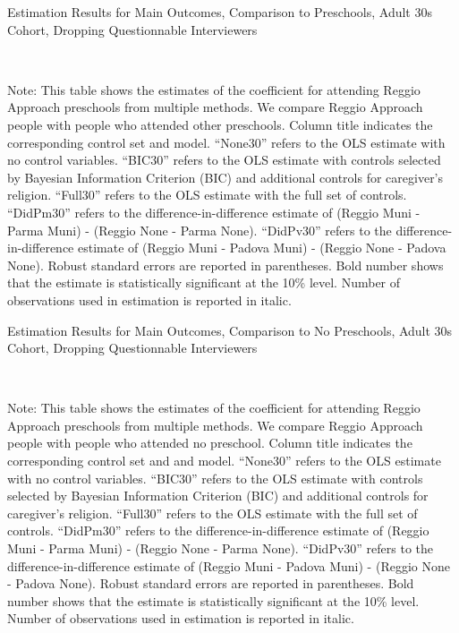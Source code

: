 \begin{table}[H] \caption{Estimation Results for Main Outcomes, Comparison to Preschools, Adult 30s Cohort, Dropping Questionnable Interviewers} \label{ols-M-adult30-reg-pres-dropint}
\scalebox{0.75}{}
\vspace{1ex} \\
\footnotesize\raggedright{Note: This table shows the estimates of the coefficient for attending Reggio Approach preschools from multiple methods. We compare Reggio Approach people with people who attended other preschools.  Column title indicates the corresponding control set and model.  ``None30'' refers to the OLS estimate with no control variables. ``BIC30'' refers to the OLS estimate with controls selected by Bayesian Information Criterion (BIC) and additional controls for caregiver's religion. ``Full30'' refers to the OLS estimate with the full set of controls. ``DidPm30'' refers to the difference-in-difference estimate of (Reggio Muni - Parma Muni) - (Reggio None - Parma None). ``DidPv30'' refers to the difference-in-difference estimate of (Reggio Muni - Padova Muni) - (Reggio None - Padova None).  Robust standard errors are reported in parentheses. Bold number shows that the estimate is statistically significant at the 10\% level. Number of observations used in estimation is reported in italic.}
\end{table}

\begin{table}[H] \caption{Estimation Results for Main Outcomes, Comparison to No Preschools, Adult 30s Cohort, Dropping Questionnable Interviewers} \label{ols-M-adult30-reg-nopres-dropint}
\scalebox{0.75}{}
\vspace{1ex} \\
\footnotesize\raggedright{Note: This table shows the estimates of the coefficient for attending Reggio Approach preschools from multiple methods. We compare Reggio Approach people with people who attended no preschool. Column title indicates the corresponding control set and and model. ``None30'' refers to the OLS estimate with no control variables. ``BIC30'' refers to the OLS estimate with controls selected by Bayesian Information Criterion (BIC) and additional controls for caregiver's religion. ``Full30'' refers to the OLS estimate with the full set of controls. ``DidPm30'' refers to the difference-in-difference estimate of (Reggio Muni - Parma Muni) - (Reggio None - Parma None). ``DidPv30'' refers to the difference-in-difference estimate of (Reggio Muni - Padova Muni) - (Reggio None - Padova None).  Robust standard errors are reported in parentheses. Bold number shows that the estimate is statistically significant at the 10\% level. Number of observations used in estimation is reported in italic.}
\end{table}




